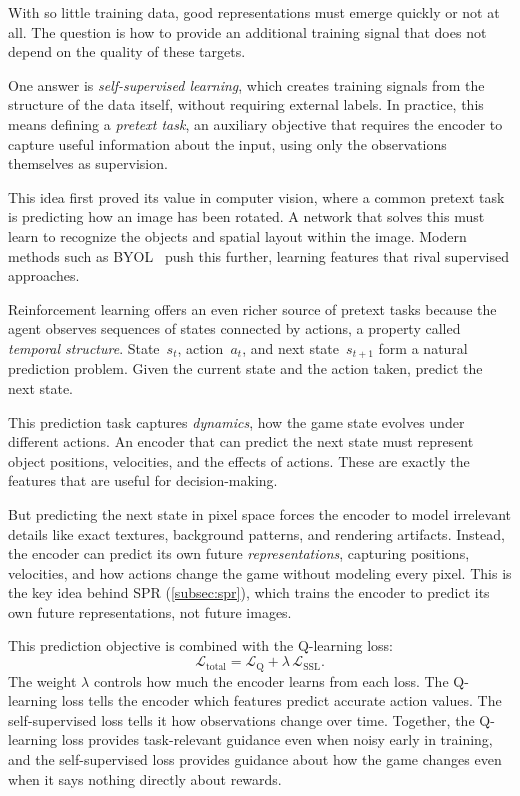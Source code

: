 \smallskip
With so little training data, good representations must emerge quickly
or not at all. The question is how to provide an additional training
signal that does not depend on the quality of these targets.

\smallskip
One answer is \emph{self-supervised learning}, which creates training
signals from the structure of the data itself, without requiring
external labels. In practice, this means defining a \emph{pretext
task}, an auxiliary objective that requires the encoder to capture
useful information about the input, using only the observations
themselves as supervision.

\smallskip
This idea first proved its value in computer vision, where a common
pretext task is predicting how an image has been rotated. A network
that solves this must learn to recognize the objects and spatial
layout within the image. Modern methods such as
BYOL~\citep{grill2020bootstrap} push this further, learning features
that rival supervised approaches.

\smallskip
Reinforcement learning offers an even richer source of pretext tasks
because the agent observes sequences of states connected by actions,
a property called \emph{temporal structure}. State~$s_t$,
action~$a_t$, and next state~$s_{t+1}$ form a natural prediction
problem. Given the current state and the action taken, predict the
next state.

\smallskip
This prediction task captures \emph{dynamics}, how the game state
evolves under different actions. An encoder that can predict the next
state must represent object positions, velocities, and the effects of
actions. These are exactly the features that are useful for
decision-making.

\smallskip
But predicting the next state in pixel space forces the encoder to
model irrelevant details like exact textures, background patterns, and
rendering artifacts. Instead, the encoder can predict its own future
\emph{representations}, capturing positions, velocities, and how
actions change the game without modeling every pixel. This is the key
idea behind SPR (\cref{subsec:spr}), which trains the encoder to
predict its own future representations, not future images.

\smallskip
This prediction objective is combined with the Q-learning loss:
%
\begin{equation}
\label{eq:ssl-loss}
\mathcal{L}_{\text{total}}
  = \mathcal{L}_{\text{Q}}
  + \lambda\, \mathcal{L}_{\text{SSL}}.
\end{equation}
%
The weight $\lambda$ controls how much the encoder learns from each
loss. The Q-learning loss tells the encoder which features predict
accurate action values. The self-supervised loss tells it how
observations change over time. Together, the Q-learning loss provides
task-relevant guidance even when noisy early in training, and the
self-supervised loss provides guidance about how the game changes even
when it says nothing directly about rewards.

